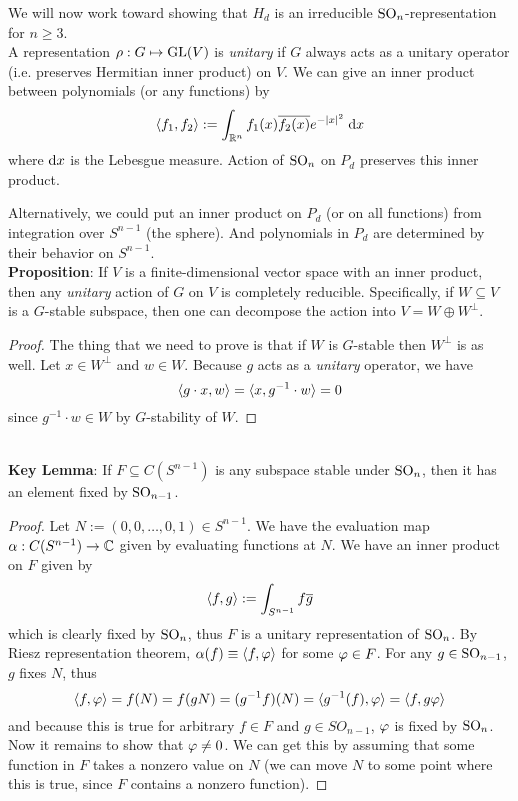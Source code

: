 \documentclass{amsart}
\begin{document}
We will now work toward showing that $H_d$ is an irreducible $\operatorname{SO}_n$-representation for $n\geq 3$.\\

A representation $\rho:G\mapsto \operatorname{GL}(V)$ is \textit{unitary} if $G$ always acts as a unitary operator (i.e. preserves Hermitian inner product) on $V$. We can give an inner product between polynomials (or any functions) by
$$
\langle f_1,f_2\rangle := \int_{\mathbb{R}^n} f_1(x)\overline{f_2(x)} e^{-|x|^2} \; \textrm{d} x
$$
where $\textrm{d} x$ is the Lebesgue measure. Action of $\operatorname{SO}_n$ on $P_d$ preserves this inner product.

Alternatively, we could put an inner product on $P_d$ (or on all functions) from integration over $S^{n-1}$ (the sphere). And polynomials in $P_d$ are determined by their behavior on $S^{n-1}$.\\

\noindent \textbf{Proposition}: If $V$ is a finite-dimensional vector space with an inner product, then any \textit{unitary} action of $G$ on $V$ is completely reducible. Specifically, if $W\subseteq V$ is a $G$-stable subspace, then one can decompose the action into $V=W\oplus W^{\bot}$.
\begin{proof}
	The thing that we need to prove is that if $W$ is $G$-stable then $W^{\bot}$ is as well. Let $x\in W^{\bot}$ and $w\in W$. Because $g$ acts as a \textit{unitary} operator, we have
	$$
	\langle g\cdot x,w\rangle = \langle x,g^{-1}\cdot w\rangle = 0
	$$
	since $g^{-1}\cdot w \in W$ by $G$-stability of $W$.
\end{proof}\\

\noindent \textbf{Key Lemma}: If $F\subseteq C(S^{n-1})$ is any subspace stable under $\operatorname{SO}_n$, then it has an element fixed by $\operatorname{SO}_{n-1}$.
\begin{proof}
	Let $N:=(0,0,\dots,0,1)\in S^{n-1}$. We have the evaluation map $\alpha:C(S^{n-1})\to \mathbb{C}$ given by evaluating functions at $N$. We have an inner product on $F$ given by 
	$$
	\langle f,g\rangle := \int_{S^{n-1}} f\overline{g}
	$$
	which is clearly fixed by $\operatorname{SO}_n$, thus $F$ is a unitary representation of $\operatorname{SO}_n$. By Riesz representation theorem, $\alpha(f)\equiv \langle f,\varphi\rangle$ for some $\varphi\in F$. For any $g\in \operatorname{SO}_{n-1}$, $g$ fixes $N$, thus
	$$
	\langle f,\varphi\rangle = f(N) = f(gN) = (g^{-1}f)(N) = \langle g^{-1}(f),\varphi\rangle = \langle f,g\varphi\rangle
	$$ 
	and because this is true for arbitrary $f\in F$ and $g\in SO_{n-1}$, $\varphi$ is fixed by $\operatorname{SO}_n$. Now it remains to show that $\varphi\neq 0$. We can get this by assuming that some function in $F$ takes a nonzero value on $N$ (we can move $N$ to some point where this is true, since $F$ contains a nonzero function).
\end{proof}\\
\end{document}
